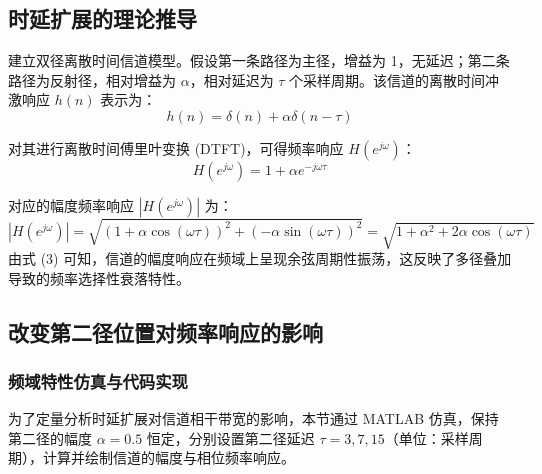\documentclass[a4paper, 11pt]{ctexart}
\begin{document}
\subsection{时延扩展的理论推导}
建立双径离散时间信道模型。假设第一条路径为主径，增益为 1，无延迟；第二条路径为反射径，相对增益为 $\alpha$，相对延迟为 $\tau$ 个采样周期。该信道的离散时间冲激响应 $h(n)$ 表示为：
\begin{equation}
    h(n) = \delta(n) + \alpha \delta(n - \tau)
\end{equation}

对其进行离散时间傅里叶变换 (DTFT)，可得频率响应 $H(e^{j\omega})$：
\begin{equation}
    H(e^{j\omega}) = 1 + \alpha e^{-j\omega\tau}
\end{equation}

对应的幅度频率响应 $|H(e^{j\omega})|$ 为：
\begin{equation}
    |H(e^{j\omega})| = \sqrt{(1 + \alpha\cos(\omega\tau))^2 + (-\alpha\sin(\omega\tau))^2} = \sqrt{1 + \alpha^2 + 2\alpha\cos(\omega\tau)}
\end{equation}
由式 (3) 可知，信道的幅度响应在频域上呈现余弦周期性振荡，这反映了多径叠加导致的频率选择性衰落特性。


\subsection{改变第二径位置对频率响应的影响}

\subsubsection{频域特性仿真与代码实现}
为了定量分析时延扩展对信道相干带宽的影响，本节通过 MATLAB 仿真，保持第二径的幅度 $\alpha = 0.5$ 恒定，分别设置第二径延迟 $\tau = 3, 7, 15$（单位：采样周期），计算并绘制信道的幅度与相位频率响应。
\end{document}
